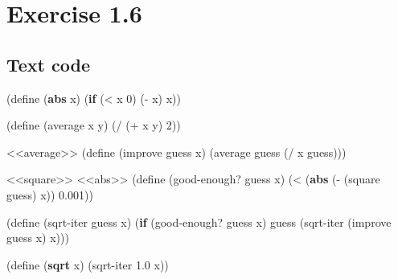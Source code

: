 \documentclass[
]{article}
\newenvironment{Shaded}{}{}
\newcommand{\DecValTok}[1]{\textcolor[rgb]{0.25,0.63,0.44}{#1}}
\newcommand{\ExtensionTok}[1]{#1}
\newcommand{\FloatTok}[1]{\textcolor[rgb]{0.25,0.63,0.44}{#1}}
\newcommand{\FunctionTok}[1]{\textcolor[rgb]{0.02,0.16,0.49}{#1}}
\newcommand{\KeywordTok}[1]{\textcolor[rgb]{0.00,0.44,0.13}{\textbf{#1}}}
\newcommand{\NormalTok}[1]{#1}
\newcommand{\OperatorTok}[1]{\textcolor[rgb]{0.40,0.40,0.40}{#1}}
\begin{document}
\hypertarget{exercise-1.6}{%
\section{Exercise 1.6}\label{exercise-1.6}}

\hypertarget{text-code}{%
\subsection{Text code}\label{text-code}}

\hypertarget{abs}{%
\label{abs}}%
\begin{Shaded}
\begin{Highlighting}[numbers=left,,]
\NormalTok{(}\ExtensionTok{define}\FunctionTok{ }\NormalTok{(}\KeywordTok{abs}\NormalTok{ x)}
\NormalTok{  (}\KeywordTok{if}\NormalTok{ (}\OperatorTok{\textless{}}\NormalTok{ x }\DecValTok{0}\NormalTok{)}
\NormalTok{      (}\OperatorTok{{-}}\NormalTok{ x)}
\NormalTok{      x))}
\end{Highlighting}
\end{Shaded}

\hypertarget{average}{%
\label{average}}%
\begin{Shaded}
\begin{Highlighting}[numbers=left,,]
\NormalTok{(}\ExtensionTok{define}\FunctionTok{ }\NormalTok{(average x y)}
\NormalTok{  (}\OperatorTok{/}\NormalTok{ (}\OperatorTok{+}\NormalTok{ x y) }\DecValTok{2}\NormalTok{))}
\end{Highlighting}
\end{Shaded}

\hypertarget{txt-sqrt}{%
\label{txt-sqrt}}%
\begin{Shaded}
\begin{Highlighting}[numbers=left,,]
\NormalTok{\textless{}\textless{}average\textgreater{}\textgreater{}}
\NormalTok{(}\ExtensionTok{define}\FunctionTok{ }\NormalTok{(improve guess x)}
\NormalTok{  (average guess (}\OperatorTok{/}\NormalTok{ x guess)))}

\NormalTok{\textless{}\textless{}square\textgreater{}\textgreater{}}
\NormalTok{\textless{}\textless{}abs\textgreater{}\textgreater{}}
\NormalTok{(}\ExtensionTok{define}\FunctionTok{ }\NormalTok{(good{-}enough? guess x)}
\NormalTok{  (}\OperatorTok{\textless{}}\NormalTok{ (}\KeywordTok{abs}\NormalTok{ (}\OperatorTok{{-}}\NormalTok{ (square guess) x)) }\FloatTok{0.001}\NormalTok{))}

\NormalTok{(}\ExtensionTok{define}\FunctionTok{ }\NormalTok{(sqrt{-}iter guess x)}
\NormalTok{  (}\KeywordTok{if}\NormalTok{ (good{-}enough? guess x)}
\NormalTok{      guess}
\NormalTok{      (sqrt{-}iter (improve guess x) x)))}

\NormalTok{(}\ExtensionTok{define}\FunctionTok{ }\NormalTok{(}\KeywordTok{sqrt}\NormalTok{ x)}
\NormalTok{  (sqrt{-}iter }\FloatTok{1.0}\NormalTok{ x))}
\end{Highlighting}
\end{Shaded}
\end{document}
